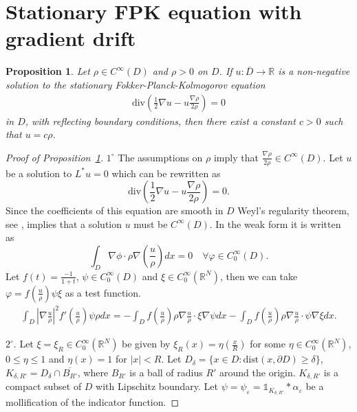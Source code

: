 \documentclass[11pt]{article}
\numberwithin{equation}{section}
\newtheorem{proposition}[theorem]{Proposition}
\theoremstyle{definition}
\begin{document}
\section{Stationary FPK equation with gradient drift}
\begin{proposition}\label{prop:unique_station_FPK_smooth_case}
    Let $\rho\in C^{\infty}(D)$ and $\rho>0$ on $D$. If $u:\overline{D}\to\mathbb{R}$ is a non-negative solution to the stationary Fokker-Planck-Kolmogorov equation 
    \begin{align*}
        \text{div}\left(\frac{1}{2}\nabla u - u\frac{\nabla\rho}{2\rho}\right)=0
    \end{align*}
    in $D$, with reflecting boundary conditions, then there exist a constant $c>0$ such that
    $u = c \rho$.
\end{proposition}
\begin{proof}[Proof of Proposition~\ref{prop:unique_station_FPK_smooth_case}]
$1^{\circ}$ The assumptions on $\rho$ imply that $\frac{\nabla\rho}{2\rho} \in C^{\infty}(D)$. Let $u$ be a solution to $L^{*}u=0$ which can be rewritten as 
\[
\text{div}\left(\frac{1}{2}\nabla u - u\frac{\nabla\rho}{2\rho}\right)=0.
\]
Since the coefficients of this equation are smooth in $D$ Weyl's regularity theorem, see \cite[Chapter I]{bogachev2015FPK}, implies that a solution $u$ must be $C^{\infty}(D)$. In the weak form it is written as
\[
    \int_{ D}\nabla\phi\cdot \rho\nabla\left(\frac{u}{\rho}\right)dx =0 \quad \forall\varphi\in C_{0}^{\infty}( D).
\]
Let $f(t)=\frac{-1}{1+t}$, $\psi\in C^{\infty}_{0}( D)$ and $\xi\in C^{\infty}_{0}(\mathbb{R}^{N})$, then we can take $\varphi = f(\frac{u}{\rho})\psi\xi$ as a test function. 
\begin{align*}
    \int_{ D}\left|\nabla\frac{u}{\rho}\right|^{2}f'\left(\frac{u}{\rho}\right)\psi \rho dx 
    = -\int_{ D}  f\left(\frac{u}{\rho}\right) \rho\nabla\frac{u}{\rho}\cdot \xi\nabla\psi dx 
      -\int_{ D}  f\left(\frac{u}{\rho}\right) \rho\nabla\frac{u}{\rho}\cdot \psi\nabla\xi dx.
\end{align*}

$2^{\circ}.$ Let $\xi=\xi_{R}\in C^{\infty}_{0}(\mathbb{R}^{N})$ be given by $\xi_{R}(x)=\eta(\frac{x}{R})$ for some $\eta\in C^{\infty}_{0}(\mathbb{R}^{N})$, $0\le\eta\le1$ and $\eta(x)=1$ for $|x|<R$. Let $D_{\delta} = \{x\in D: \text{dist}(x,\partial D)\ge\delta\}$, $K_{\delta,R'} = D_{\delta}\cap \overline{B_{R'}}$, where $B_{R'}$ is a ball of radius $R'$ around the origin. $K_{\delta, R'}$ is a compact subset of $D$ with Lipschitz boundary. Let $\psi = \psi_{\varepsilon} = \mathds{1}_{K_{\delta, R'}}*\alpha_{\varepsilon}$ be a mollification of the indicator function.


\end{proof}
\end{document}

